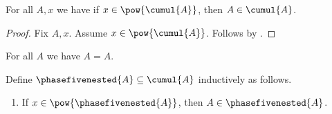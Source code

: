 \begin{proposition}\label{phase5_nested_guard}
    For all $A, x$ we have if $x\in\pow{\cumul{A}}$, then
        $A\in\cumul{A}$.
\end{proposition}
\begin{proof}
    Fix $A, x$.
    Assume $x\in\pow{\cumul{A}}$.
    Follows by \auto.
\end{proof}

\begin{axiom}\label{phase5_nested_unsafe_support}
    For all $A$ we have $A=A$.
\end{axiom}

\begin{inductive}\label{phase5_nested}
    Define $\phasefivenested{A}\subseteq\cumul{A}$ inductively as follows.
    \begin{enumerate}
        \item If $x\in\pow{\phasefivenested{A}}$, then
            $A\in\phasefivenested{A}$.
    \end{enumerate}
\end{inductive}
